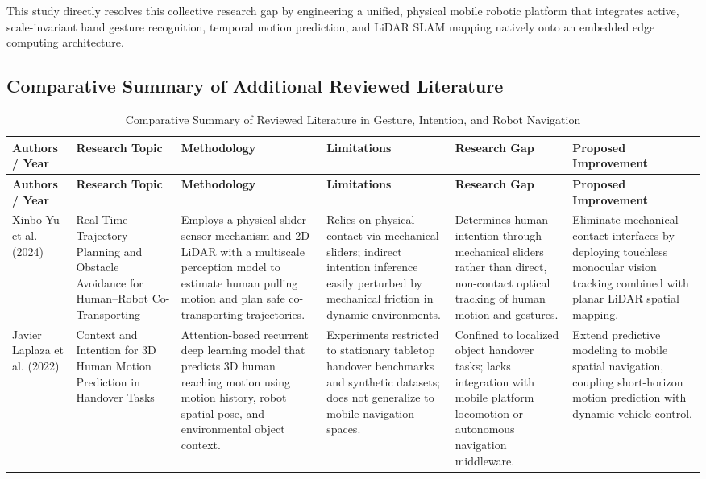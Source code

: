 This study directly resolves this collective research gap by engineering a unified, physical mobile robotic platform that integrates active, scale-invariant hand gesture recognition, temporal motion prediction, and LiDAR SLAM mapping natively onto an embedded edge computing architecture.

\begin{landscape}
\section{Comparative Summary of Additional Reviewed Literature}

\footnotesize
\begin{longtable}{|
>{\RaggedRight\arraybackslash}p{3.2cm}|
>{\RaggedRight\arraybackslash}p{3.5cm}|
>{\RaggedRight\arraybackslash}p{5.2cm}|
>{\RaggedRight\arraybackslash}p{3.8cm}|
>{\RaggedRight\arraybackslash}p{3.8cm}|
>{\RaggedRight\arraybackslash}p{3.8cm}|
}
\caption{Comparative Summary of Reviewed Literature in Gesture, Intention, and Robot Navigation}
\label{tab:lit_review_landscape}\\
\hline
\textbf{Authors / Year} & \textbf{Research Topic} & \textbf{Methodology} & \textbf{Limitations} & \textbf{Research Gap} & \textbf{Proposed Improvement} \\
\hline
\endfirsthead

\hline
\textbf{Authors / Year} & \textbf{Research Topic} & \textbf{Methodology} & \textbf{Limitations} & \textbf{Research Gap} & \textbf{Proposed Improvement} \\
\hline
\endhead

Xinbo Yu et al. (2024) \cite{yu2024} &
Real-Time Trajectory Planning and Obstacle Avoidance for Human--Robot Co-Transporting &
Employs a physical slider-sensor mechanism and 2D LiDAR with a multiscale perception model to estimate human pulling motion and plan safe co-transporting trajectories. &
Relies on physical contact via mechanical sliders; indirect intention inference easily perturbed by mechanical friction in dynamic environments. &
Determines human intention through mechanical sliders rather than direct, non-contact optical tracking of human motion and gestures. &
Eliminate mechanical contact interfaces by deploying touchless monocular vision tracking combined with planar LiDAR spatial mapping. \\
\hline

Javier Laplaza et al. (2022) \cite{laplaza2022} &
Context and Intention for 3D Human Motion Prediction in Handover Tasks &
Attention-based recurrent deep learning model that predicts 3D human reaching motion using motion history, robot spatial pose, and environmental object context. &
Experiments restricted to stationary tabletop handover benchmarks and synthetic datasets; does not generalize to mobile navigation spaces. &
Confined to localized object handover tasks; lacks integration with mobile platform locomotion or autonomous navigation middleware. &
Extend predictive modeling to mobile spatial navigation, coupling short-horizon motion prediction with dynamic vehicle control. \\
\hline


\end{longtable}
\end{landscape}
